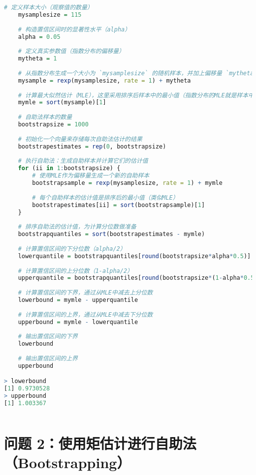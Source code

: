 \documentclass[UTF8]{report}
\theoremstyle{MyLineTheoremStyle} %
\theoremstyle{MyBlockTheoremStyle} %
\theoremstyle{MySubsubsectionStyle} %
\begin{document}
\begin{lstlisting}[language=R]
    # 定义样本大小（观察值的数量）
    mysamplesize = 115
    
    # 构造置信区间时的显著性水平（alpha）
    alpha = 0.05
    
    # 定义真实参数值（指数分布的偏移量）
    mytheta = 1
    
    # 从指数分布生成一个大小为 `mysamplesize` 的随机样本，并加上偏移量 `mytheta`
    mysample = rexp(mysamplesize, rate = 1) + mytheta
    
    # 计算最大似然估计（MLE），这里采用排序后样本中的最小值（指数分布的MLE就是样本中的最小值）
    mymle = sort(mysample)[1]
    
    # 自助法样本的数量
    bootstrapsize = 1000
    
    # 初始化一个向量来存储每次自助法估计的结果
    bootstrapestimates = rep(0, bootstrapsize)
    
    # 执行自助法：生成自助样本并计算它们的估计值
    for (ii in 1:bootstrapsize) {
        # 使用MLE作为偏移量生成一个新的自助样本
        bootstrapsample = rexp(mysamplesize, rate = 1) + mymle
        
        # 每个自助样本的估计值是排序后的最小值（类似MLE）
        bootstrapestimates[ii] = sort(bootstrapsample)[1]
    }
    
    # 排序自助法的估计值，为计算分位数做准备
    bootstrapquantiles = sort(bootstrapestimates - mymle)
    
    # 计算置信区间的下分位数（alpha/2）
    lowerquantile = bootstrapquantiles[round(bootstrapsize*alpha*0.5)]
    
    # 计算置信区间的上分位数（1-alpha/2）
    upperquantile = bootstrapquantiles[round(bootstrapsize*(1-alpha*0.5))]
    
    # 计算置信区间的下界，通过从MLE中减去上分位数
    lowerbound = mymle - upperquantile
    
    # 计算置信区间的上界，通过从MLE中减去下分位数
    upperbound = mymle - lowerquantile
    
    # 输出置信区间的下界
    lowerbound
    
    # 输出置信区间的上界
    upperbound

> lowerbound
[1] 0.9730528
> upperbound
[1] 1.003367
    
\end{lstlisting}




\chapter{问题 2：使用矩估计进行自助法（Bootstrapping）}
\end{document}
